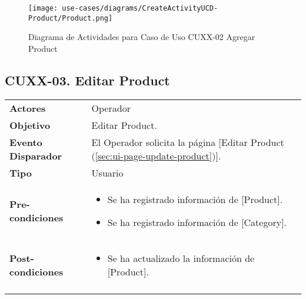 	\begin{figure}[H]
		\begin{center}
			\label{tab:activity-create-ucd-entity-product}
			\texttt{[image: use-cases/diagrams/CreateActivityUCD-Product/Product.png]}
			\caption{Diagrama de Actividades para Caso de Uso CUXX-02 Agregar Product}	
	    \end{center}
	\end{figure}
			
	
	\clearpage
	\subsection{CUXX-03. Editar Product} \label{sec:cu-update-Product}
	
	\begin{tabular}{ p{3.5cm} p{11.5cm} }
		\textbf{Actores} & Operador\\
		\textbf{Objetivo} & Editar Product.\\
		\textbf{Evento Disparador} & El Operador solicita la p\'agina [Editar Product (\ref{sec:ui-page-update-product})].\\
		\textbf{Tipo} & Usuario\\
		\textbf{Pre-condiciones} &
			\begin{minipage}[t]{0.6\textwidth}
			\begin{itemize}[noitemsep,nolistsep]
			\setlength{\itemindent}{-.5cm}
				\item Se ha registrado informaci\'on de [Product].
				\item Se ha registrado informaci\'on de [Category].
			\end{itemize}
			\end{minipage} \\
		\textbf{Post-condiciones} &
			\begin{minipage}[t]{0.6\textwidth}
			\begin{itemize}[noitemsep,nolistsep]
			\setlength{\itemindent}{-.5cm}
				\item Se ha actualizado la informaci\'on de [Product].
			\end{itemize}
			\end{minipage} \\
		\\
	\end{tabular}
	
